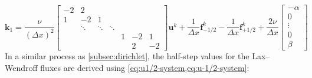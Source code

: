 \begin{equation}
    \label{eq:final-neumann-system}
    \mathbf{k}_1 = \frac{\nu }{(\Delta x)^2}\begin{bmatrix}
                                                -2 & 2      &        &        &   &    &    \\
                                                1  & -2     & 1      &        &   &    &    \\
                                                & \ddots & \ddots & \ddots &   &    &    \\
                                                &        &        &        & 1 & -2 & 1  \\
                                                &        &        &        &   & 2  & -2
    \end{bmatrix}\mathbf{u}^k+\frac{1}{\Delta x}\mathbf{f}_{-1/2}^k-\frac{1}{\Delta x}\mathbf{f}_{+1/2}^k+
    \frac{2\nu }{\Delta x}\begin{bmatrix}
                              -\alpha \\
                              0       \\
                              \vdots  \\
                              0       \\
                              \beta
    \end{bmatrix}
\end{equation}
In a similar process as \cref{subsec:dirichlet}, the half-step values for the Lax--Wendroff fluxes are derived using \cref{eq:u1/2-system,eq:u-1/2-system}:
